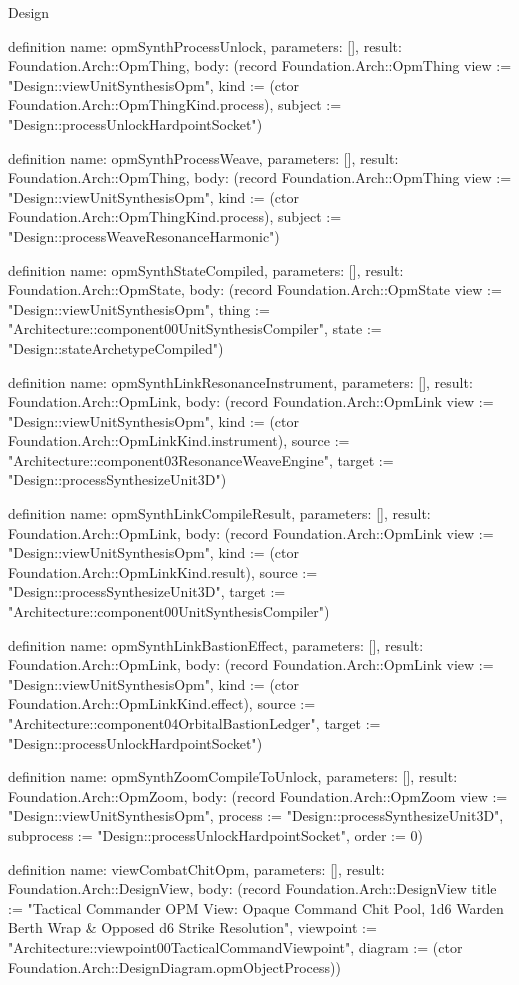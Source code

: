 \begin{lexlean}{Design}
\begin{semanticmodule}
definition{
  name: opmSynthProcessUnlock,
  parameters: [],
  result: Foundation.Arch::OpmThing,
  body: (record Foundation.Arch::OpmThing {view := "Design::viewUnitSynthesisOpm", kind := (ctor Foundation.Arch::OpmThingKind.process), subject := "Design::processUnlockHardpointSocket"})
}

definition{
  name: opmSynthProcessWeave,
  parameters: [],
  result: Foundation.Arch::OpmThing,
  body: (record Foundation.Arch::OpmThing {view := "Design::viewUnitSynthesisOpm", kind := (ctor Foundation.Arch::OpmThingKind.process), subject := "Design::processWeaveResonanceHarmonic"})
}

definition{
  name: opmSynthStateCompiled,
  parameters: [],
  result: Foundation.Arch::OpmState,
  body: (record Foundation.Arch::OpmState {view := "Design::viewUnitSynthesisOpm", thing := "Architecture::component00UnitSynthesisCompiler", state := "Design::stateArchetypeCompiled"})
}

definition{
  name: opmSynthLinkResonanceInstrument,
  parameters: [],
  result: Foundation.Arch::OpmLink,
  body: (record Foundation.Arch::OpmLink {view := "Design::viewUnitSynthesisOpm", kind := (ctor Foundation.Arch::OpmLinkKind.instrument), source := "Architecture::component03ResonanceWeaveEngine", target := "Design::processSynthesizeUnit3D"})
}

definition{
  name: opmSynthLinkCompileResult,
  parameters: [],
  result: Foundation.Arch::OpmLink,
  body: (record Foundation.Arch::OpmLink {view := "Design::viewUnitSynthesisOpm", kind := (ctor Foundation.Arch::OpmLinkKind.result), source := "Design::processSynthesizeUnit3D", target := "Architecture::component00UnitSynthesisCompiler"})
}

definition{
  name: opmSynthLinkBastionEffect,
  parameters: [],
  result: Foundation.Arch::OpmLink,
  body: (record Foundation.Arch::OpmLink {view := "Design::viewUnitSynthesisOpm", kind := (ctor Foundation.Arch::OpmLinkKind.effect), source := "Architecture::component04OrbitalBastionLedger", target := "Design::processUnlockHardpointSocket"})
}

definition{
  name: opmSynthZoomCompileToUnlock,
  parameters: [],
  result: Foundation.Arch::OpmZoom,
  body: (record Foundation.Arch::OpmZoom {view := "Design::viewUnitSynthesisOpm", process := "Design::processSynthesizeUnit3D", subprocess := "Design::processUnlockHardpointSocket", order := 0})
}

definition{
  name: viewCombatChitOpm,
  parameters: [],
  result: Foundation.Arch::DesignView,
  body: (record Foundation.Arch::DesignView {title := "Tactical Commander OPM View: Opaque Command Chit Pool, 1d6 Warden Berth Wrap & Opposed d6 Strike Resolution", viewpoint := "Architecture::viewpoint00TacticalCommandViewpoint", diagram := (ctor Foundation.Arch::DesignDiagram.opmObjectProcess)})
}


\end{semanticmodule}
\end{lexlean}
